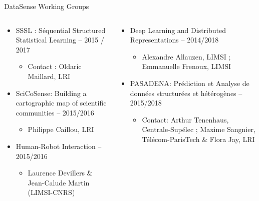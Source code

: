 \begin{frame}{DataSense Working Groups}
\begin{columns}
\begin{column}[t]{5.5cm}
\begin{itemize}
        \item SSSL : Séquential Structured Statistical Learning – 2015 / 2017
          \begin{itemize}
          \item Contact : Oldaric Maillard, LRI
          \end{itemize}

      \item SciCoSense: Building a cartographic map of scientific communities -- 2015/2016
        \begin{itemize}
        \item Philippe Caillou, LRI
        \end{itemize}

      \item Human-Robot Interaction -- 2015/2016
        \begin{itemize}
        \item Laurence Devillers \& Jean-Calude Martin (LIMSI-CNRS) 
        \end{itemize}
      \end{itemize}    
    \end{column}
    \begin{column}[t]{6.5cm}

      \begin{itemize}    
      \item Deep Learning and Distributed Representations -- 2014/2018
        \begin{itemize}
        \item Alexandre Allauzen, LIMSI ; Emmanuelle Frenoux, LIMSI 
        \end{itemize}

      \item PASADENA: Prédiction et Analyse de données structurées et hétérogènes -- 2015/2018
        \begin{itemize}
          \item Contact: Arthur Tenenhaus, Centrale-Supélec ; Maxime Sangnier, Télécom-ParisTech &
Flora Jay, LRI
        \end{itemize}

      \end{itemize}
    \end{column}
  \end{columns}
\end{frame}

